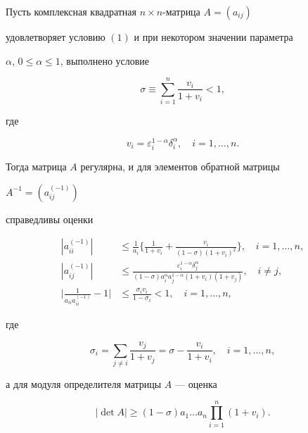\begin{thmnonum} 


Пусть комплексная квадратная $n\times n$-матрица $A=(a_{ij})$ 


удовлетворяет условию $(1)$ и при некотором значении параметра 


$\alpha$, $0\le\alpha\le 1$, выполнено условие 


\begin{equation} 


\sigma\equiv\sum^n_{i=1}\frac{v_i}{1+v_i}<1, 


\end{equation} 


где 


\begin{equation} 


v_i=\varepsilon^{1-\alpha}_i\delta^\alpha_i,\quad 


i=1,\dotsc,n. 


\end{equation} 


Тогда матрица $A$ регулярна, и для элементов обратной матрицы 


$A^{-1}=(a^{(-1)}_{ij})$ 


справедливы оценки 


\begin{align} 


|a^{(-1)}_{ii}|&\le\frac{1}{a_i}\biggl\{\frac{1}{1+v_i}+ 


\frac{v_i}{(1-\sigma)(1+v_i)^2}\biggr\},\quad i=1,\dotsc,n,\\ 


% 


|a^{(-1)}_{ij}|&\le\frac{\varepsilon^{1-\alpha}_i\delta^\alpha_j} 


{(1-\sigma)a^\alpha_i a^{1-\alpha}_j(1+v_i)(1+v_j)},\quad 


i\ne j, \\ 


% 


\biggl|\frac{1}{a_{ii}a^{(-1)}_{ii}}-1\biggr|&\le 


\frac{\sigma_i v_i}{1-\sigma_i} <1,\quad i=1,\dotsc,n, 


\end{align} 


где 


\begin{equation} 


\sigma_i=\sum_{j\ne i}\frac{v_j}{1+v_j}= 


\sigma-\frac{v_i}{1+v_i},\quad i=1,\dotsc,n, 


\end{equation} 


а для модуля определителя матрицы $A$ --- оценка 


\begin{equation} 


|\det A|\ge(1-\sigma)a_1\dotsc a_n\prod^n_{i=1}(1+v_i). 


\end{equation} 


\end{thmnonum} 


